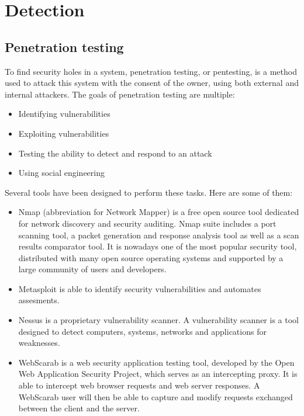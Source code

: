 \section{Detection}

\subsection{Penetration testing}

To find security holes in a system, penetration testing, or pentesting, is a
method used to attack this system with the consent of the owner, using both
external and internal attackers. The goals of penetration testing are multiple:
\begin{itemize}
\item Identifying vulnerabilities
\item Exploiting vulnerabilities
\item Testing the ability to detect and respond to an attack
\item Using social engineering
\end{itemize}

Several tools have been designed to perform these tasks.
Here are some of them:
\begin{itemize}
\item Nmap (abbreviation for Network Mapper) is a free open source tool
	dedicated for network discovery and security auditing. Nmap suite includes
	a port scanning tool, a packet generation and response analysis tool as
	well as a scan results comparator tool.  It is nowadays one of the most
	popular security tool, distributed with many open source operating systems
	and supported by a large community of users and developers.
\item Metasploit is able to identify security vulnerabilities and automates
	assesments.
\item Nessus is a proprietary vulnerability scanner. A vulnerability scanner
	is a tool designed to detect computers, systems, networks and applications
	for weaknesses.
\item WebScarab is a web security application testing tool, developed by the
	Open Web Application Security Project, which serves as an intercepting
	proxy. It is able to intercept web browser requests and web server
	responses. A WebScarab user will then be able to capture and modify
	requests exchanged between the client and the server.
\end{itemize}

